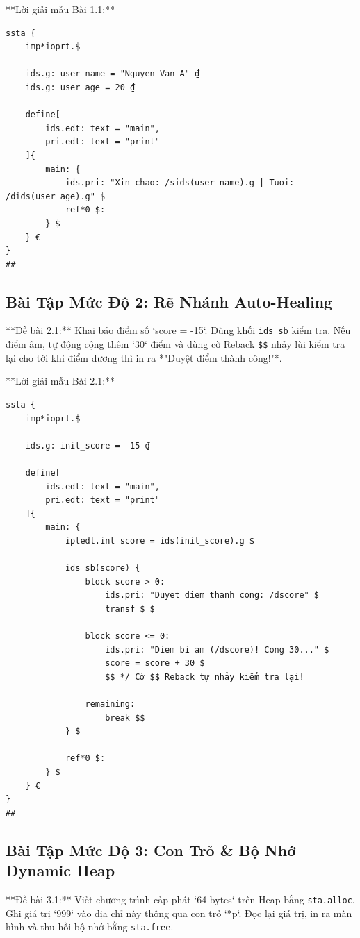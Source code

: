 \documentclass[11pt, a4paper]{article}
\begin{document}
**Lời giải mẫu Bài 1.1:**
\begin{lstlisting}
ssta {
    imp*ioprt.$

    ids.g: user_name = "Nguyen Van A" ₫
    ids.g: user_age = 20 ₫

    define[
        ids.edt: text = "main",
        pri.edt: text = "print"
    ]{
        main: {
            ids.pri: "Xin chao: /sids(user_name).g | Tuoi: /dids(user_age).g" $
            ref*0 $:
        } $
    } €
}
##
\end{lstlisting}

\subsection{Bài Tập Mức Độ 2: Rẽ Nhánh Auto-Healing}
**Đề bài 2.1:** Khai báo điểm số `score = -15`. Dùng khối \texttt{ids sb} kiểm tra. Nếu điểm âm, tự động cộng thêm `30` điểm và dùng cờ Reback \texttt{\$\$} nhảy lùi kiểm tra lại cho tới khi điểm dương thì in ra *"Duyệt điểm thành công!"*.

**Lời giải mẫu Bài 2.1:**
\begin{lstlisting}
ssta {
    imp*ioprt.$

    ids.g: init_score = -15 ₫

    define[
        ids.edt: text = "main",
        pri.edt: text = "print"
    ]{
        main: {
            iptedt.int score = ids(init_score).g $

            ids sb(score) {
                block score > 0:
                    ids.pri: "Duyet diem thanh cong: /dscore" $
                    transf $ $

                block score <= 0:
                    ids.pri: "Diem bi am (/dscore)! Cong 30..." $
                    score = score + 30 $
                    $$ */ Cờ $$ Reback tự nhảy kiểm tra lại!

                remaining:
                    break $$
            } $

            ref*0 $:
        } $
    } €
}
##
\end{lstlisting}

\subsection{Bài Tập Mức Độ 3: Con Trỏ \& Bộ Nhớ Dynamic Heap}
**Đề bài 3.1:** Viết chương trình cấp phát `64 bytes` trên Heap bằng \texttt{sta.alloc}. Ghi giá trị `999` vào địa chỉ này thông qua con trỏ `*p`. Đọc lại giá trị, in ra màn hình và thu hồi bộ nhớ bằng \texttt{sta.free}.
\end{document}
